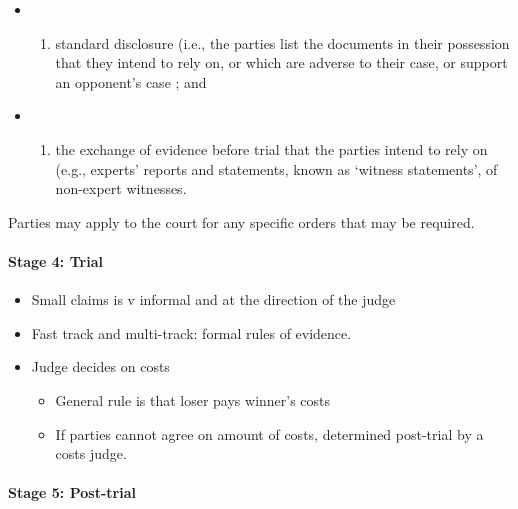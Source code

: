 \documentclass[
]{article}
\providecommand{\tightlist}{%
  \setlength{\itemsep}{0pt}\setlength{\parskip}{0pt}}
\begin{document}
\begin{itemize}
\item
  \begin{enumerate}
  \def\labelenumi{(\alph{enumi})}
  \tightlist
  \item
    standard disclosure (i.e., the parties list the documents in their
    possession that they intend to rely on, or which are adverse to
    their case, or support an opponent's case ; and
  \end{enumerate}
\item
  \begin{enumerate}
  \def\labelenumi{(\alph{enumi})}
  \setcounter{enumi}{1}
  \tightlist
  \item
    the exchange of evidence before trial that the parties intend to
    rely on (e.g., experts' reports and statements, known as `witness
    statements', of non-expert witnesses.
  \end{enumerate}
\end{itemize}

Parties may apply to the court for any specific orders that may be
required.

\hypertarget{stage-4-trial}{%
\paragraph{Stage 4: Trial}\label{stage-4-trial}}

\begin{itemize}
\tightlist
\item
  Small claims is v informal and at the direction of the judge
\item
  Fast track and multi-track: formal rules of evidence.
\item
  Judge decides on costs

  \begin{itemize}
  \tightlist
  \item
    General rule is that loser pays winner's costs
  \item
    If parties cannot agree on amount of costs, determined post-trial by
    a costs judge.
  \end{itemize}
\end{itemize}

\hypertarget{stage-5-post-trial}{%
\paragraph{Stage 5: Post-trial}\label{stage-5-post-trial}}
\end{document}
